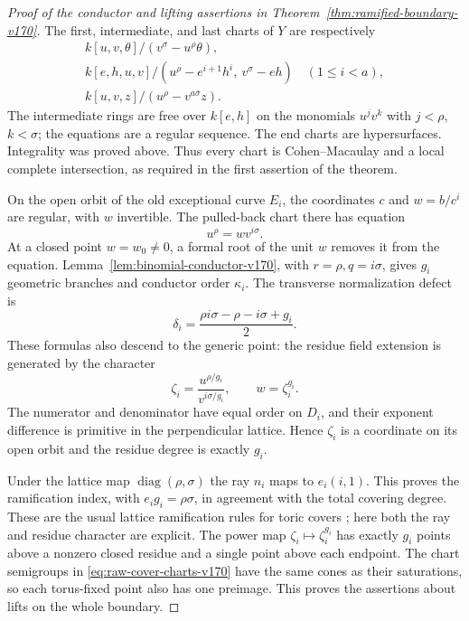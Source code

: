 \documentclass[11pt,reqno]{amsart}
\numberwithin{equation}{section}
\theoremstyle{definition}\newtheorem{definition}[theorem]{Definition}
\theoremstyle{remark}\newtheorem{remark}[theorem]{Remark}
\begin{document}
\begin{proof}[Proof of the conductor and lifting assertions in
Theorem~\ref{thm:ramified-boundary-v170}]
The first, intermediate, and last charts of $Y$ are respectively
\begin{equation}\label{eq:raw-cover-charts-v170}
 \begin{gathered}
 k[u,v,\theta]/(v^\sigma-u^\rho\theta),\\
 k[e,h,u,v]/(u^\rho-e^{i+1}h^i,\ v^\sigma-eh)
                  \quad(1\leq i<a),\\
 k[u,v,z]/(u^\rho-v^{a\sigma}z).
 \end{gathered}
\end{equation}
The intermediate rings are free over $k[e,h]$ on the monomials
$u^jv^k$ with $j<\rho$, $k<\sigma$; the equations are a regular
sequence. The end charts are hypersurfaces. Integrality was proved
above. Thus every chart is Cohen--Macaulay and a local complete
intersection, as required in the first assertion of the theorem.

On the open orbit of the old exceptional curve $E_i$, the coordinates
$c$ and $w=b/c^i$ are regular, with $w$ invertible. The pulled-back
chart there has equation
\begin{equation}\label{eq:transverse-binomial-v170}
 u^\rho=w v^{i\sigma}.
\end{equation}
At a closed point $w=w_0\ne0$, a formal root of the unit $w$ removes
it from the equation. Lemma~\ref{lem:binomial-conductor-v170}, with
$r=\rho,q=i\sigma$, gives $g_i$ geometric branches and conductor
order $\kappa_i$. The transverse normalization defect is
\begin{equation}\label{eq:delta-defect-v170}
 \delta_i=\frac{\rho i\sigma-\rho-i\sigma+g_i}{2}.
\end{equation}
These formulas also descend to the generic point: the residue field
extension is generated by the character
\begin{equation}\label{eq:root-residue-v170}
 \zeta_i=\frac{u^{\rho/g_i}}{v^{i\sigma/g_i}},\qquad
 w=\zeta_i^{g_i}.
\end{equation}
The numerator and denominator have equal order on $D_i$, and their
exponent difference is primitive in the perpendicular lattice. Hence
$\zeta_i$ is a coordinate on its open orbit and the residue degree
is exactly $g_i$.

Under the lattice map $\operatorname{diag}(\rho,\sigma)$ the ray
$n_i$ maps to $e_i(i,1)$. This proves the ramification index, with
$e_i g_i=\rho\sigma$, in agreement with the total covering degree.
These are the usual lattice ramification rules for toric covers
\cite[Definition~1 and Lemma~1]{AlexeevPardini170}; here both the
ray and residue character are explicit. The power map
$\zeta_i\mapsto\zeta_i^{g_i}$ has exactly $g_i$ points above a
nonzero closed residue and a single point above each endpoint.
The chart semigroups in \eqref{eq:raw-cover-charts-v170} have the
same cones as their saturations, so each torus-fixed point also has
one preimage. This proves the assertions about lifts on the whole
boundary.


\end{proof}
\end{document}
